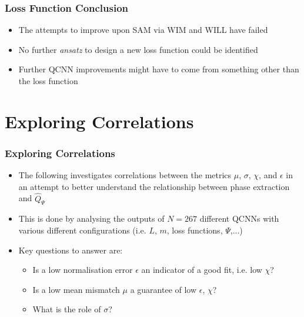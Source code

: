 \documentclass{beamer}
\begin{document}
\begin{frame}
\frametitle{Loss Function Conclusion}
\begin{itemize}
\item The attempts to improve upon SAM via \alert{WIM and WILL have failed} 
\item No further \emph{ansatz} to design a new loss function could be identified  
\item Further \alert{QCNN improvements} might have to come from something \alert{other than the loss function} 
\end{itemize}
\end{frame}

\section{Exploring Correlations}

\begin{frame}
\frametitle{Exploring Correlations}
\begin{itemize}
\item The following investigates \alert{correlations between the metrics} $\mu$, $\sigma$, $\chi$, and $\epsilon$ in an attempt to better understand the relationship between phase extraction and $\hat{Q}_\Psi$
\item This is done by analysing the outputs of $N=267$ different QCNNs with \alert{various different configurations} (i.e. $L$, $m$, loss functions, $\Psi$,...)
\item Key questions to answer are:
\begin{itemize}
\item Is a low normalisation error $\epsilon$ an indicator of a good fit, i.e. low $\chi$?
\item Is a low mean mismatch $\mu$ a guarantee of low $\epsilon$, $\chi$? 
\item What is the role of $\sigma$?
\end{itemize}
\end{itemize}
\end{frame}
\end{document}
